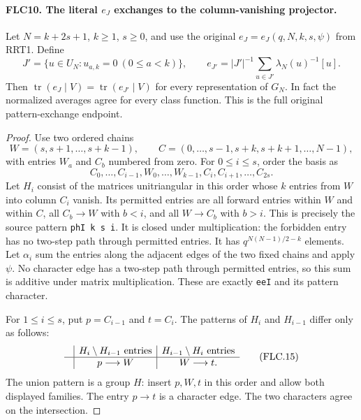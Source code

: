 \paragraph{FLC10. The literal $e_J$ exchanges to the column-vanishing projector.}
\label{claim:FLC10}
Let $N=k+2s+1$, $k\ge1$, $s\ge0$, and use the original
$e_J=e_J(q,N,k,s,\psi)$ from RRT1.  Define
\[
 J'=\{u\in U_N:u_{a,k}=0\ (0\le a<k)\},\qquad
 e_{J'}=|J'|^{-1}\sum_{u\in J'}\lambda_N(u)^{-1}[u].
\]
Then $\operatorname{tr}(e_J\mid V)
=\operatorname{tr}(e_{J'}\mid V)$ for every representation of
$G_N$.  In fact the normalized averages agree for every class
function.  This is the full original pattern-exchange endpoint.
\begin{proof}
Use two ordered chains
\[
 W=(s,s+1,\ldots,s+k-1),\qquad
 C=(0,\ldots,s-1,s+k,s+k+1,\ldots,N-1),
\]
with entries $W_a$ and $C_b$ numbered from zero.  For
$0\le i\le s$, order the basis as
\[
 C_0,\ldots,C_{i-1},W_0,\ldots,W_{k-1},C_i,C_{i+1},\ldots,C_{2s}.
\]
Let $H_i$ consist of the matrices unitriangular in this order
whose $k$ entries from $W$ into column $C_i$ vanish.
Its permitted entries are all forward entries within $W$ and
within $C$, all $C_b\to W$ with $b<i$, and all $W\to C_b$
with $b>i$.  This is precisely the source pattern
\texttt{phI k s i}.  It is closed under multiplication: the
forbidden entry has no two-step path through permitted entries.
It has $q^{N(N-1)/2-k}$ elements.  Let $\alpha_i$ sum the
entries along the adjacent edges of the two fixed chains and
apply $\psi$.  No character edge has a two-step path through
permitted entries, so this sum is additive under matrix
multiplication.  These are exactly \texttt{eeI} and its
pattern character.

For $1\le i\le s$, put $p=C_{i-1}$ and $t=C_i$.
The patterns of $H_i$ and $H_{i-1}$ differ only as follows:
\[
 \begin{array}{c|c|c}
       &H_i\setminus H_{i-1}\text{ entries}
       &H_{i-1}\setminus H_i\text{ entries}\\ \hline
       &p\longrightarrow W&W\longrightarrow t.
 \end{array}
 \tag{FLC.15}
\]
The union pattern is a group $H$: insert $p,W,t$ in this
order and allow both displayed families.  The entry $p\to t$
is a character edge.  The two characters agree on the
intersection.


\end{proof}
